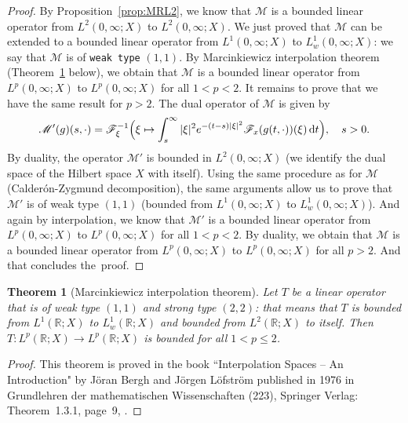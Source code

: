 \documentclass[a4paper, 12pt]{article}
\theoremstyle{plain}
\newtheorem{theorem}[proposition]{Theorem}
\theoremstyle{definition}
\theoremstyle{remark}
\numberwithin{equation}{section}
\begin{document}
\begin{proof}
\noindent
By Proposition~\ref{prop:MRL2}, we know that ${\mathscr{M}}$ is a bounded linear operator from $L^2(0,\infty;X)$ to 
$L^2(0,\infty;X)$. We just proved that ${\mathscr{M}}$ can be extended to a bounded linear operator from $L^1(0,\infty;X)$
to $L^1_w(0,\infty;X)$: we say that ${\mathscr{M}}$ is of {\tt weak type} $(1,1)$. By Marcinkiewicz interpolation theorem
(Theorem~\ref{thm:marcinkiewicz} below), 
we obtain that ${\mathscr{M}}$ is a bounded linear operator
from $L^p(0,\infty;X)$ to $L^p(0,\infty;X)$ for all $1<p<2$. It remains to prove that we have the same result for $p>2$. The dual 
operator of ${\mathscr{M}}$ is given by
%
\begin{equation}
\label{eq:M'}
{\mathscr{M}}'(g)(s,\cdot)=
{\mathscr{F}}_{\xi}^{-1}\Bigl(\xi\mapsto \int_s^\infty |\xi|^2e^{-(t-s)|\xi|^2}{\mathscr{F}}_x(g(t,\cdot))(\xi)\,{\rm d}t \Bigr), \quad
s>0.
\end{equation}
%
By duality, the operator ${\mathscr{M}}'$ is bounded in $L^2(0,\infty;X)$ (we identify the dual space of the Hilbert space $X$ with
itself). Using the same procedure as for ${\mathscr{M}}$ (Calder\'on-Zygmund decomposition), the same arguments allow us to 
prove that ${\mathscr{M}}'$ is of weak type $(1,1)$ (bounded from $L^1(0,\infty;X)$ to $L^1_w(0,\infty;X)$). And again by interpolation,
we know that ${\mathscr{M}}'$ is a bounded linear operator from $L^p(0,\infty;X)$ to $L^p(0,\infty;X)$ for all $1<p<2$. By duality, we
obtain that ${\mathscr{M}}$ is a bounded linear operator from $L^p(0,\infty;X)$ to $L^p(0,\infty;X)$ for all $p>2$. And that concludes the\
proof.
\end{proof}

\begin{theorem}[Marcinkiewicz interpolation theorem]
\label{thm:marcinkiewicz}
Let $T$ be a linear operator that is of weak type $(1,1)$ and strong type $(2,2)$: that means that $T$ is bounded from $L^1({\mathds{R}};X)$
to $L^1_w({\mathds{R}};X)$ and bounded from $L^2({\mathds{R}};X)$ to itself. Then $T:L^p({\mathds{R}};X)\to L^p({\mathds{R}};X)$
is bounded for all $1<p\le 2$.
\end{theorem}

\begin{proof}
This theorem is proved in the book ``Interpolation Spaces -- An Introduction" by J\"oran Bergh and J\"orgen L\"ofstr\"om published in
1976 in Grundlehren der mathematischen Wissenschaften (223), Springer Verlag: Theorem~1.3.1, page~9, \cite{BL76}.
\end{proof}
\end{document}
